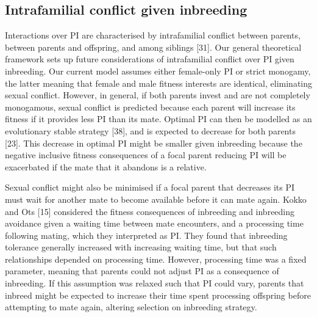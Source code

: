 \documentclass[12pt]{article}
\begin{document}
\subsection*{Intrafamilial conflict given inbreeding}

Interactions over PI are characterised by intrafamilial conflict between parents, between parents and offspring, and among siblings [31]. Our general theoretical framework sets up future considerations of intrafamilial conflict over PI given inbreeding. Our current model assumes either female-only PI or strict monogamy, the latter meaning that female and male fitness interests are identical, eliminating sexual conflict. However, in general, if both parents invest and are not completely monogamous, sexual conflict is predicted because each parent will increase its fitness if it provides less PI than its mate. Optimal PI can then be modelled as an evolutionary stable strategy [38], and is expected to decrease for both parents [23]. This decrease in optimal PI might be smaller given inbreeding because the negative inclusive fitness consequences of a focal parent reducing PI will be exacerbated if the mate that it abandons is a relative. 

Sexual conflict might also be minimised if a focal parent that decreases its PI must wait for another mate to become available before it can mate again. Kokko and Ots [15] considered the fitness consequences of inbreeding and inbreeding avoidance given a waiting time between mate encounters, and a processing time following mating, which they interpreted as PI. They found that inbreeding tolerance generally increased with increasing waiting time, but that such relationships depended on processing time.  However, processing time was a fixed parameter, meaning that parents could not adjust PI as a consequence of inbreeding. If this assumption was relaxed such that PI could vary, parents that inbreed might be expected to increase their time spent processing offspring before attempting to mate again, altering selection on inbreeding strategy.
\end{document}
